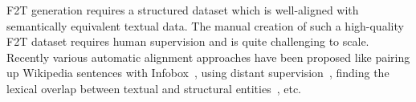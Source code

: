 \documentclass[11pt]{article}
\begin{document}

F2T generation requires a structured dataset which is well-aligned with semantically equivalent textual data. The manual creation of such a high-quality F2T dataset requires human supervision and is quite challenging to scale. Recently various automatic alignment approaches have been proposed like pairing up Wikipedia sentences with Infobox~\cite{lebret2016wikibio}, using distant supervision~\cite{elsahar2018trex}, finding the lexical overlap between textual and structural entities~\cite{jin2020genwiki, fu2020partially, agarwal2021knowledge}, etc.
\end{document}
